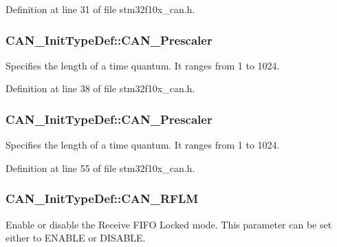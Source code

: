 Definition at line 31 of file stm32f10x\+\_\+can.\+h.

\subsubsection[{\texorpdfstring{C\+A\+N\+\_\+\+Prescaler}{CAN_Prescaler}}]{ C\+A\+N\+\_\+\+Init\+Type\+Def\+::\+C\+A\+N\+\_\+\+Prescaler}\hypertarget{struct_c_a_n___init_type_def_a6b48cdffcbfa0a2555cf4608feea91bf}{}\label{struct_c_a_n___init_type_def_a6b48cdffcbfa0a2555cf4608feea91bf}
Specifies the length of a time quantum. It ranges from 1 to 1024. 

Definition at line 38 of file stm32f10x\+\_\+can.\+h.

\subsubsection[{\texorpdfstring{C\+A\+N\+\_\+\+Prescaler}{CAN_Prescaler}}]{ C\+A\+N\+\_\+\+Init\+Type\+Def\+::\+C\+A\+N\+\_\+\+Prescaler}\hypertarget{struct_c_a_n___init_type_def_a3e91dbcbf30b893a9bd6a65606cb8fe9}{}\label{struct_c_a_n___init_type_def_a3e91dbcbf30b893a9bd6a65606cb8fe9}
Specifies the length of a time quantum. It ranges from 1 to 1024. 

Definition at line 55 of file stm32f10x\+\_\+can.\+h.

\subsubsection[{\texorpdfstring{C\+A\+N\+\_\+\+R\+F\+LM}{CAN_RFLM}}]{ C\+A\+N\+\_\+\+Init\+Type\+Def\+::\+C\+A\+N\+\_\+\+R\+F\+LM}\hypertarget{struct_c_a_n___init_type_def_aa63787683c0ad533b513fb60355d76f1}{}\label{struct_c_a_n___init_type_def_aa63787683c0ad533b513fb60355d76f1}
Enable or disable the Receive F\+I\+FO Locked mode. This parameter can be set either to E\+N\+A\+B\+LE or D\+I\+S\+A\+B\+LE. 

